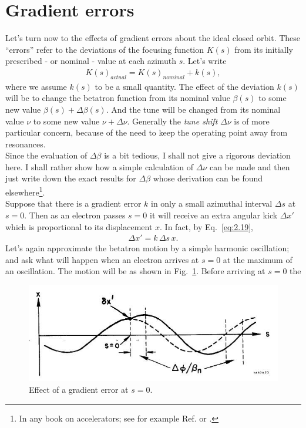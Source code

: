\section{Gradient errors}\label{sec:2.11}

Let’s turn now to the effects of gradient errors about the ideal closed orbit. These ``errors'' refer to the deviations of the focusing function $K(s)$ from its initially prescribed
- or nominal - value at each azimuth $s$. Let’s write
\begin{align}
	K(s)_{actual} = K(s)_{nominal} + k(s),
\end{align}
where we assume $k(s)$ to be a small quantity. The effect of the deviation $k(s)$ will be to change the betatron function from its nominal value $\beta(s)$ to some new value $\beta(s)+\Delta\beta(s)$. And the tune will be changed from its nominal value $\nu$ to some new value $\nu + \Delta\nu$. Generally the \emph{tune shift} $\Delta\nu$ is of more particular concern, because of the need to keep the operating point away from resonances.\\
Since the evaluation of $\Delta\beta$ is a bit tedious, I shall not give a rigorous deviation
here. I shall rather show how a simple calculation of $\Delta\nu$ can be made and then just write down the exact results for $\Delta\beta$ whose derivation can be found elsewhere\footnote{In any book on accelerators; see for example Ref. \cite{5} or \cite{7}.}.\\
Suppose that there is a gradient error $k$ in only a small azimuthal interval $\Delta s$ at $s = 0$. Then as an electron passes $s = 0$ it will receive an extra angular kick $\Delta x'$ which is proportional to its displacement $x$. In fact, by Eq.~\eqref{eq:2.19},
\begin{align}\label{eq:2.96}
	\Delta x' = k\, \Delta s\, x.
\end{align}
Let’s again approximate the betatron motion by a simple harmonic oscillation; and ask what will happen when an electron arrives at $s = 0$ at the maximum of an oscillation. The motion will be as shown in Fig.~\ref{fig:fig23}. Before arriving at $s = 0$ the
\begin{figure}[!htb]
	\centering
	\includegraphics[width=0.8\linewidth]{./Figuras/fig23.jpeg}
	\caption{Effect of a gradient error at $s = 0$.}
	\label{fig:fig23}
\end{figure}
